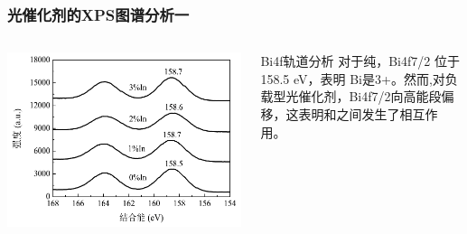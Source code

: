\documentclass[xetex,compress]{mybeamer}
\begin{document}
\begin{frame}
\frametitle{光催化剂的XPS图谱分析一}
\begin{columns}
\begin{block}{}
\centering
\includegraphics[width=\linewidth]{figures/三氧化二铟BI4F.jpg} 
\end{block}
\begin{block}{Bi4f轨道分析}
对于纯，Bi4f7/2 位于 158.5 eV，表明 Bi是3+。然而,对负载型光催化剂，Bi4f7/2向高能段偏移，这表明和之间发生了相互作用。
\end{block}
\end{columns}
\end{frame}
\end{document}
